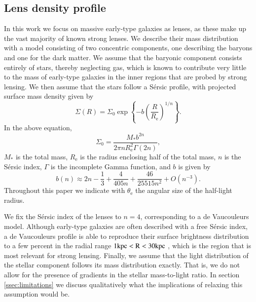 \documentclass{aa}
\def\reff{R_{\mathrm{e}}}
\def\mstar{M_*}
\def\teff{\theta_{\mathrm{e}}}
\begin{document}
\subsection{Lens density profile}\label{ssec:profile}

In this work we focus on massive early-type galaxies as lenses, as these make up the vast majority of known strong lenses.
We describe their mass distribution with a model consisting of two concentric components, one describing the baryons and one for the dark matter.
We assume that the baryonic component consists entirely of stars, thereby neglecting gas, which is known to contribute very little to the mass of early-type galaxies in the inner regions that are probed by strong lensing. 
We then assume that the stars follow a S\'{e}rsic profile, with 
projected surface mass density given by
\begin{equation}
\Sigma(R) = \Sigma_0 \exp{\left\{-b\left(\frac{R}{\reff}\right)^{1/n}\right\}}.
\end{equation}
In the above equation,
\begin{equation}
\Sigma_0 = \frac{\mstar b^{2n}}{2\pi n \reff^2 \Gamma(2n)},
\end{equation}
$\mstar$ is the total mass, $\reff$ is the radius enclosing half of the total mass, $n$ is the S\'{e}rsic index, $\Gamma$ is the incomplete Gamma function, and $b$ is given by \citep{C+B99}
\begin{equation}
b(n) \approx 2n -\frac13 + \frac{4}{405n} + \frac{46}{25515n^2} + O(n^{-3}).
\end{equation}
Throughout this paper we indicate with $\teff$ the angular size of the half-light radius.

We fix the S\'{e}rsic index of the lenses to $n=4$, corresponding to a de Vaucouleurs model.
Although early-type galaxies are often described with a free S\'{e}rsic index, a de Vaucouleurs profile is able to reproduce their surface brightness distribution to a few percent in the radial range $1\rm{kpc} < R < 30\rm{kpc}$ \citep[see e.g.][]{Son20}, which is the region that is most relevant for strong lensing.
Finally, we assume that the light distribution of the stellar component follows its mass distribution exactly. That is, we do not allow for the presence of gradients in the stellar mass-to-light ratio. In section \ref{ssec:limitations} we discuss qualitatively what the implications of relaxing this assumption would be.
\end{document}
